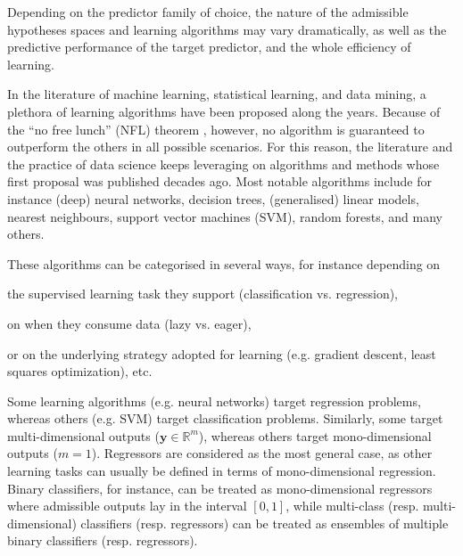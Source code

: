 \documentclass[12pt,a4paper,openright,twoside]{book}
\begin{document}
Depending on the predictor family of choice, the nature of the admissible hypotheses spaces and learning algorithms may vary dramatically, as well as the predictive performance of the target predictor, and the whole efficiency of learning.

In the literature of machine learning, statistical learning, and data mining, a plethora of learning algorithms have been proposed along the years.
%
Because of the ``no free lunch'' (NFL) theorem \cite{DolpertM97}, however, no algorithm is guaranteed to outperform the others in all possible scenarios.
%
For this reason, the literature and the practice of data science keeps leveraging on algorithms and methods whose first proposal was published decades ago.
%
Most notable algorithms include for instance (deep) neural networks, decision trees, (generalised) linear models, nearest neighbours, support vector machines (SVM), random forests, and many others.

These algorithms can be categorised in several ways, for instance depending on
%
\begin{inlinelist}
    \item the supervised learning task they support (classification vs. regression),
    \item on when they consume data (lazy vs. eager),
    \item or on the underlying strategy adopted for learning (e.g. gradient descent, least squares optimization), etc.
\end{inlinelist}

Some learning algorithms (e.g. neural networks) target regression problems, whereas others (e.g. SVM) target classification problems.
%
Similarly, some target multi-dimensional outputs ($\mathbf{y} \in \mathbb{R}^m$), whereas others target mono-dimensional outputs ($m = 1$).
%
Regressors are considered as the most general case, as other learning tasks can usually be defined in terms of mono-dimensional regression.
%
Binary classifiers, for instance, can be treated as mono-dimensional regressors where admissible outputs lay in the interval $[0, 1]$, while multi-class (resp. multi-dimensional) classifiers (resp. regressors) can be treated as ensembles of multiple binary classifiers (resp. regressors).
\end{document}

